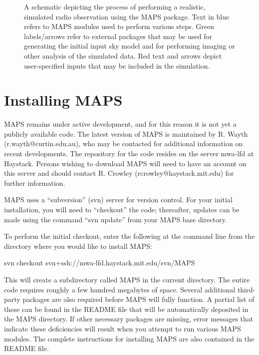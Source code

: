 \documentclass[12pt,psfig]{article}
\begin{document}
\begin{figure}
\vspace{2.5in}


\vspace{0.5cm}
\caption{A schematic depicting the process of
performing a realistic, simulated radio observation 
using the MAPS package. Text in  blue refers to MAPS modules
used to perform various steps. Green labels/arrows refer to
external packages that may be used for generating the initial input
sky model and for performing imaging or other analysis of the
simulated data. Red text  and arrows depict user-specified inputs that
may be included in the simulation.}
\end{figure}

\section{Installing MAPS}
%
MAPS remains under active development, and for this reason it is
not yet a publicly available code. The latest version of MAPS is maintained by
R. Wayth (r.wayth@curtin.edu.au), who may be contacted for
additional information on recent developments. 
The repository for the code resides on the
server {\sf mwa-lfd} at Haystack.  
Persons wishing to download MAPS will need to
have an account on this server and should contact R. Crowley 
(rcrowley@haystack.mit.edu) for further information. 

MAPS uses a ``subversion'' (svn) server for version control. 
For your initial
installation, you will need to ``checkout'' the code; thereafter,
updates can be made using the command ``svn update'' from your MAPS base 
directory. 

To perform the 
initial checkout, enter the following at the command line from the
directory where you would like to install MAPS:

\bigskip

\noindent {\tiny \%} svn checkout svn+ssh://mwa-lfd.haystack.mit.edu/svn/MAPS

\bigskip

\noindent This will create a subdirectory called {\sf MAPS} 
in the current directory. The entire code requires roughly a few
hundred megabytes of space. Several additional third-party packages
are also required before MAPS will fully function. A partial list of
these can be found in the README file that will be automatically deposited 
in the {\sf MAPS} directory. If
other necessary packages 
are missing, error messages that indicate these deficiencies 
will result when you attempt to run various MAPS modules.
The complete instructions for installing MAPS are also contained in
the README file.
\end{document}
